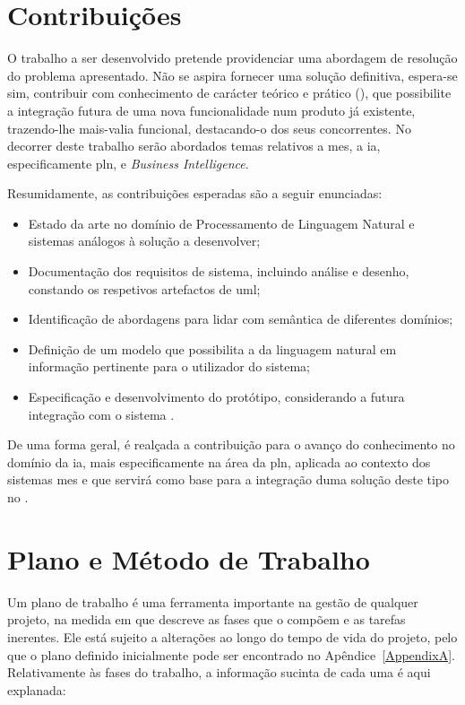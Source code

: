 \section{Contribuições}
\label{sec:chap01_contributions}
O trabalho a ser desenvolvido pretende providenciar uma abordagem de resolução do problema apresentado. Não se aspira fornecer uma solução definitiva, espera-se sim, contribuir com conhecimento de carácter teórico e prático (), que possibilite a integração futura de uma nova funcionalidade num produto já existente, trazendo-lhe mais-valia funcional, destacando-o dos seus concorrentes. No decorrer deste trabalho serão abordados temas relativos a \gls{mes}, a \gls{ia}, especificamente \gls{pln}, e \textit{Business Intelligence}.

Resumidamente, as contribuições esperadas são a seguir enunciadas:

\begin{itemize}
    \item
    {
        Estado da arte no domínio de Processamento de Linguagem Natural e sistemas análogos à solução a desenvolver;
    }
    \item 
    {
        Documentação dos requisitos de sistema, incluindo análise e desenho, constando os respetivos artefactos de \gls{uml};
    }
    \item 
    {
        Identificação de abordagens para lidar com semântica de diferentes domínios;
    }
    \item 
    {
        Definição de um modelo que possibilita a  da linguagem natural em informação pertinente para o utilizador do sistema; 
    }
    \item
    {
        Especificação e desenvolvimento do protótipo, considerando a futura integração com o sistema {\productname}.
    }
\end{itemize}

De uma forma geral, é realçada a contribuição para o avanço do conhecimento no domínio da \gls{ia}, mais especificamente na área da \gls{pln}, aplicada ao contexto dos sistemas \gls{mes} e que servirá como base para a integração duma solução deste tipo no {\productname}.

\section{Plano e Método de Trabalho}
\label{sec:chap01_workmethodology}
Um plano de trabalho é uma ferramenta importante na gestão de qualquer projeto, na medida em que descreve as fases que o compõem e as tarefas inerentes. Ele está sujeito a alterações ao longo do tempo de vida do projeto, pelo que o plano definido inicialmente pode ser encontrado no Apêndice~\ref{AppendixA}. Relativamente às fases do trabalho, a informação sucinta de cada uma é aqui explanada:

